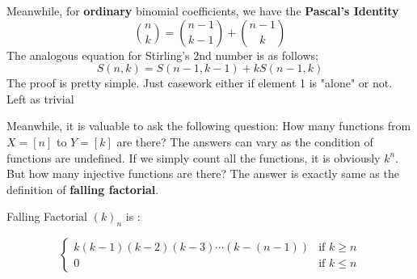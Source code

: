 \documentclass[12pt]{article}
\begin{document}
Meanwhile, for \textbf{ordinary} binomial coefficients, we have the \textbf{Pascal's Identity}
\[
\binom{n}{k} = \binom{n-1}{k-1} + \binom{n-1}{k}
\]
The analogous equation for Stirling's 2nd number is as follows;
\[
S(n,k) = S(n-1,k-1) + kS(n-1,k)
\]
The proof is pretty simple. Just casework either if element 1 is "alone" or not. Left as trivial

Meanwhile, it is valuable to ask the following question: How many functions from $X = [n]$ to $Y = [k] $ are there? The answers can vary as the condition of functions are undefined. If we simply count all the functions, it is obviously $k^n$. But how many injective functions are there? The answer is exactly same as the definition of \textbf{falling factorial}.

\begin{description}
  \item[Falling Factorial $(k)_n$ is :]
\end{description}
\[
\begin{cases}
  k(k-1)(k-2)(k-3) \cdots (k-(n-1)) &\text{if } k \geq n \\
  0 &\text{if } k \leq n
\end{cases}
\]
\end{document}
